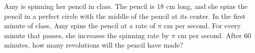 Amy is spinning her pencil in class. The pencil is $18$ cm long, and she spins the pencil in a perfect circle with the middle of the pencil at its center. In the first minute of class, Amy spins the pencil at a rate of $\pi$ cm per second. For every minute that passes, she increases the spinning rate by  $\pi$ cm per second. After $60$ minutes, how many revolutions will the pencil have made?
